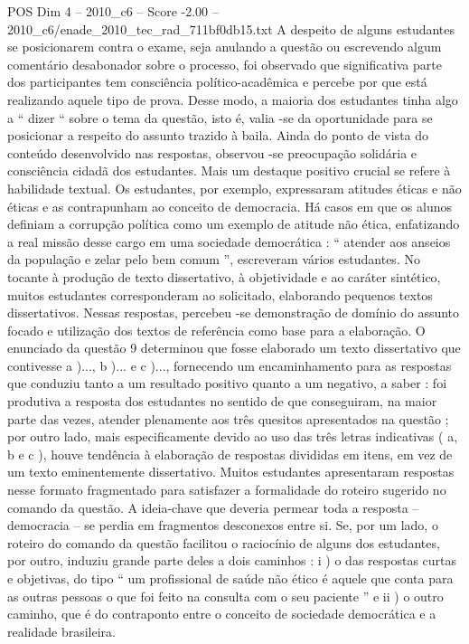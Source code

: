 \begin{textsample}{POS Dim 4 – 2010\_c6 – Score -2.00 – 2010\_c6/enade\_2010\_tec\_rad\_711bf0db15.txt}
A despeito de alguns estudantes se posicionarem contra o exame, seja anulando a questão ou escrevendo algum comentário desabonador sobre o processo, foi observado que significativa parte dos participantes tem consciência político-acadêmica e percebe por que está realizando aquele tipo de prova.
Desse modo, a maioria dos estudantes tinha algo a “ dizer “ sobre o tema da questão, isto é, valia -se da oportunidade para se posicionar a respeito do assunto trazido à baila.
Ainda do ponto de vista do conteúdo desenvolvido nas respostas, observou -se preocupação solidária e consciência cidadã dos estudantes.
Mais um destaque positivo crucial se refere à habilidade textual.
Os estudantes, por exemplo, expressaram atitudes éticas e não éticas e as contrapunham ao conceito de democracia.
Há casos em que os alunos definiam a corrupção política como um exemplo de atitude não ética, enfatizando a real missão desse cargo em uma sociedade democrática : “ atender aos anseios da população e zelar pelo bem comum ”, escreveram vários estudantes.
No tocante à produção de texto dissertativo, à objetividade e ao caráter sintético, muitos estudantes corresponderam ao solicitado, elaborando pequenos textos dissertativos.
Nessas respostas, percebeu -se demonstração de domínio do assunto focado e utilização dos textos de referência como base para a elaboração.
O enunciado da questão 9 determinou que fosse elaborado um texto dissertativo que contivesse a )..., b )... e c )..., fornecendo um encaminhamento para as respostas que conduziu tanto a um resultado positivo quanto a um negativo, a saber : foi produtiva a resposta dos estudantes no sentido de que conseguiram, na maior parte das vezes, atender plenamente aos três quesitos apresentados na questão ; por outro lado, mais especificamente devido ao uso das três letras indicativas ( a, b e c ), houve tendência à elaboração de respostas divididas em itens, em vez de um texto eminentemente dissertativo.
Muitos estudantes apresentaram respostas nesse formato fragmentado para satisfazer a formalidade do roteiro sugerido no comando da questão.
A ideia-chave que deveria permear toda a resposta – democracia – se perdia em fragmentos desconexos entre si.
Se, por um lado, o roteiro do comando da questão facilitou o raciocínio de alguns dos estudantes, por outro, induziu grande parte deles a dois caminhos : i ) o das respostas curtas e objetivas, do tipo “ um profissional de saúde não ético é aquele que conta para as outras pessoas o que foi feito na consulta com o seu paciente ” e ii ) o outro caminho, que é do contraponto entre o conceito de sociedade democrática e a realidade brasileira.

\end{textsample}
